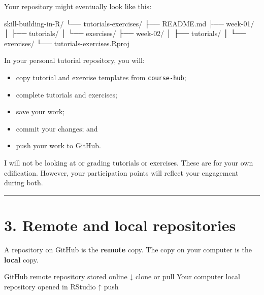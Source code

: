 \documentclass[
  letterpaper,
  DIV=11,
  numbers=noendperiod]{scrartcl}
\newenvironment{Shaded}{\begin{snugshade}}{\end{snugshade}}
\newcommand{\NormalTok}[1]{\textcolor[rgb]{0.00,0.23,0.31}{#1}}
\providecommand{\tightlist}{%
  \setlength{\itemsep}{0pt}\setlength{\parskip}{0pt}}
\begin{document}
Your repository might eventually look like this:

\begin{Shaded}
\begin{Highlighting}[]
\NormalTok{skill{-}building{-}in{-}R/}
\NormalTok{└── tutorials{-}exercises/}
\NormalTok{    ├── README.md}
\NormalTok{    ├── week{-}01/}
\NormalTok{    │   ├── tutorials/}
\NormalTok{    │   └── exercises/}
\NormalTok{    ├── week{-}02/}
\NormalTok{    │   ├── tutorials/}
\NormalTok{    │   └── exercises/}
\NormalTok{    └── tutorials{-}exercises.Rproj}
\end{Highlighting}
\end{Shaded}

In your personal tutorial repository, you will:

\begin{itemize}
\tightlist
\item
  copy tutorial and exercise templates from \texttt{course-hub};
\item
  complete tutorials and exercises;
\item
  save your work;
\item
  commit your changes; and
\item
  push your work to GitHub.
\end{itemize}

I will not be looking at or grading tutorials or exercises. These are
for your own edification. However, your participation points will
reflect your engagement during both.

\begin{center}\rule{0.5\linewidth}{0.5pt}\end{center}

\section{3. Remote and local
repositories}\label{remote-and-local-repositories}

A repository on GitHub is the \textbf{remote} copy. The copy on your
computer is the \textbf{local} copy.

\begin{Shaded}
\begin{Highlighting}[]
\NormalTok{GitHub}
\NormalTok{remote repository stored online}
\NormalTok{        ↓ clone or pull}
\NormalTok{Your computer}
\NormalTok{local repository opened in RStudio}
\NormalTok{        ↑ push}
\end{Highlighting}
\end{Shaded}
\end{document}
